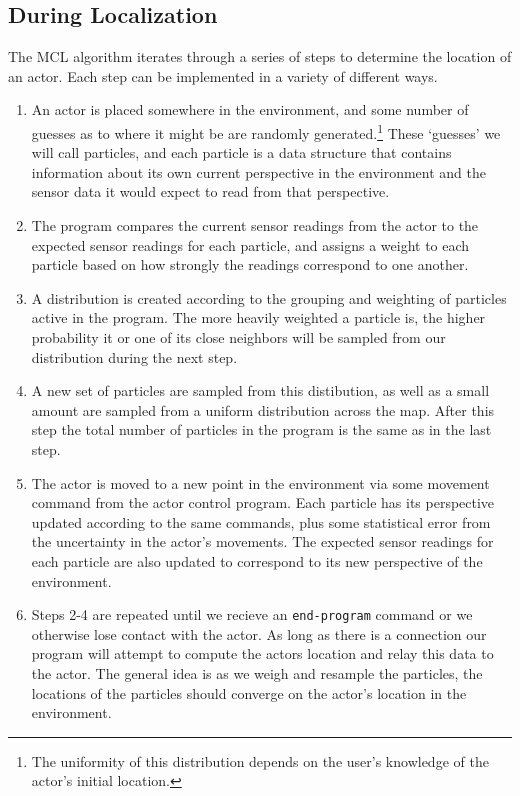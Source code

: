 \documentclass[a4paper,11pt]{article}
\begin{document}
\subsection{During Localization}
  The MCL algorithm iterates through a series of steps to determine the location of an actor. Each step can be implemented in a variety of different ways.
  \begin{enumerate}
  \item An actor is placed somewhere in the environment, and some number of guesses as to where it might be are randomly generated.\footnote{The uniformity of this distribution depends on the user's knowledge of the actor's initial location.} These `guesses' we will call particles, and each particle is a data structure that contains information about its own current perspective in the environment and the sensor data it would expect to read from that perspective.
  \item The program compares the current sensor readings from the actor to the expected sensor readings for each particle, and assigns a weight to each particle based on how strongly the readings correspond to one another.
  \item A distribution is created according to the grouping and weighting of particles active in the program. The more heavily weighted a particle is, the higher probability it or one of its close neighbors will be sampled from our distribution during the next step.
  \item A new set of particles are sampled from this distibution, as well as a small amount are sampled from a uniform distribution across the map. After this step the total number of particles in the program is the same as in the last step.
  \item The actor is moved to a new point in the environment via some movement command from the actor control program. Each particle has its perspective updated according to the same commands, plus some statistical error from the uncertainty in the actor's movements. The expected sensor readings for each particle are also updated to correspond to its new perspective of the environment.
  \item Steps 2-4 are repeated until we recieve an \texttt{end-program} command or we otherwise lose contact with the actor. As long as there is a connection our program will attempt to compute the actors location and relay this data to the actor. The general idea is as we weigh and resample the particles, the locations of the particles should converge on the actor's location in the environment.
  \end{enumerate} 
  
\end{document}
